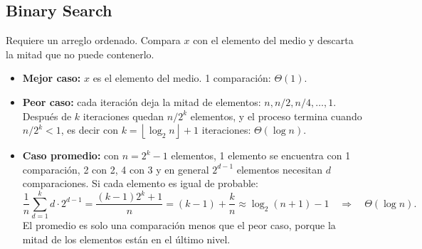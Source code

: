 \documentclass[11pt]{article}
\newcommand{\floor}[1]{\left\lfloor #1 \right\rfloor}
\begin{document}
\subsection*{Binary Search}
Requiere un arreglo ordenado. Compara $x$ con el elemento del medio y descarta la mitad que no puede contenerlo.
\begin{itemize}
  \item \textbf{Mejor caso:} $x$ es el elemento del medio. 1 comparación: $\Theta(1)$.
  \item \textbf{Peor caso:} cada iteración deja la mitad de elementos: $n, n/2, n/4, \dots, 1$. Después de $k$ iteraciones quedan $n/2^k$ elementos, y el proceso termina cuando $n/2^k < 1$, es decir con $k = \floor{\log_2 n} + 1$ iteraciones: $\Theta(\log n)$.
  \item \textbf{Caso promedio:} con $n = 2^k - 1$ elementos, 1 elemento se encuentra con 1 comparación, 2 con 2, 4 con 3 y en general $2^{d-1}$ elementos necesitan $d$ comparaciones. Si cada elemento es igual de probable:
  \[
  \frac{1}{n}\sum_{d=1}^{k} d\cdot 2^{d-1} = \frac{(k-1)2^k + 1}{n} = (k-1) + \frac{k}{n} \approx \log_2(n+1) - 1 \quad\Rightarrow\quad \Theta(\log n).
  \]
  El promedio es solo una comparación menos que el peor caso, porque la mitad de los elementos están en el último nivel.
\end{itemize}
\end{document}
